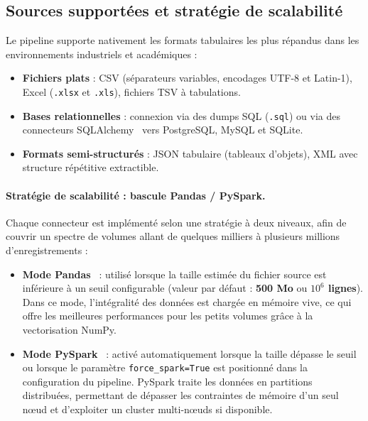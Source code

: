\subsection{Sources supportées et stratégie de scalabilité}
\label{subsec:sources}

Le pipeline supporte nativement les formats tabulaires les plus
répandus dans les environnements industriels et académiques :
\begin{itemize}
    \item \textbf{Fichiers plats} : CSV (séparateurs variables,
          encodages UTF-8 et Latin-1), Excel (\texttt{.xlsx} et
          \texttt{.xls}), fichiers TSV à tabulations.
    \item \textbf{Bases relationnelles} : connexion via des dumps SQL
          (\texttt{.sql}) ou via des connecteurs SQLAlchemy~\cite{bayer2012sqlalchemy}
          vers PostgreSQL, MySQL et SQLite.
    \item \textbf{Formats semi-structurés} : JSON tabulaire (tableaux
          d'objets), XML avec structure répétitive extractible.
\end{itemize}

\paragraph{Stratégie de scalabilité : bascule Pandas / PySpark.}
Chaque connecteur est implémenté selon une stratégie à deux niveaux,
afin de couvrir un spectre de volumes allant de quelques milliers à
plusieurs millions d'enregistrements :
\begin{itemize}
    \item \textbf{Mode Pandas}~\cite{pandas2020} :
          utilisé lorsque la taille estimée du fichier source est
          inférieure à un seuil configurable (valeur par défaut :
          \textbf{500 Mo} ou \textbf{$10^6$ lignes}).
          Dans ce mode, l'intégralité des données est chargée en
          mémoire vive, ce qui offre les meilleures performances
          pour les petits volumes grâce à la vectorisation NumPy.
    \item \textbf{Mode PySpark}~\cite{zaharia2016spark} :
          activé automatiquement lorsque la taille dépasse le seuil
          ou lorsque le paramètre \texttt{force\_spark=True} est
          positionné dans la configuration du pipeline.
          PySpark traite les données en partitions distribuées,
          permettant de dépasser les contraintes de mémoire d'un
          seul nœud et d'exploiter un cluster multi-nœuds si
          disponible.
\end{itemize}

